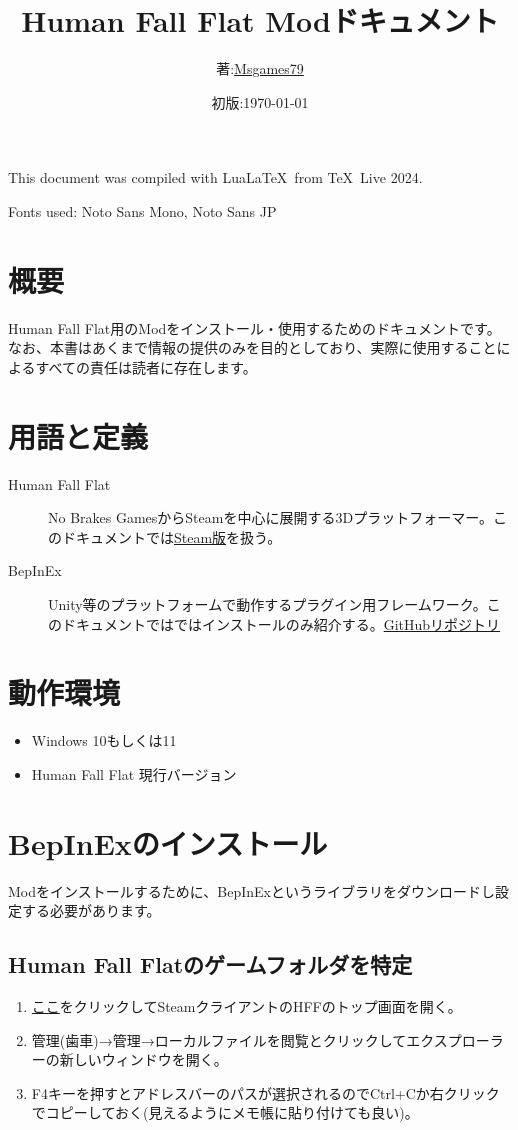 \documentclass[lualatex,a4paper,fontsize=11pt,jafontscale=0.9247,titlepage,oneside]{jlreq}
\begin{document}
\title{Human Fall Flat Modドキュメント}
\author{著:\;\href{https://www.youtube.com/channel/UCKpnq5EXLCcuPsEGAjyXbsg}{Msgames79}}
\date{初版:\;\today}
\maketitle
This document was compiled with Lua\LaTeX\ from \TeX\ Live 2024.\par
Fonts used: Noto Sans Mono, Noto Sans JP
\tableofcontents
\clearpage
\section{概要}
Human Fall Flat用のModをインストール・使用するためのドキュメントです。なお、本書はあくまで情報の提供のみを目的としており、実際に使用することによるすべての責任は読者に存在します。
\section{用語と定義}
\begin{description}
\item[Human Fall Flat]No Brakes GamesからSteamを中心に展開する3Dプラットフォーマー。このドキュメントでは\href{https://store.steampowered.com/app/477160}{Steam版}を扱う。
\item[BepInEx]Unity等のプラットフォームで動作するプラグイン用フレームワーク。このドキュメントではではインストールのみ紹介する。\href{https://github.com/BepInEx/BepInEx}{GitHubリポジトリ}
\end{description}
\section{動作環境}
\begin{itemize}
\item Windows 10もしくは11
\item Human Fall Flat 現行バージョン
\end{itemize}
\section{BepInExのインストール}
Modをインストールするために、BepInExというライブラリをダウンロードし設定する必要があります。
\subsection{Human Fall Flatのゲームフォルダを特定}
\begin{enumerate}
\item \href{steam://open/games/details/477160}{ここ}をクリックしてSteamクライアントのHFFのトップ画面を開く。
\item \label{4.1.2}管理(歯車)→管理→ローカルファイルを閲覧とクリックしてエクスプローラーの新しいウィンドウを開く。
\item \label{4.1.3}F4キーを押すとアドレスバーのパスが選択されるのでCtrl+Cか右クリックでコピーしておく(見えるようにメモ帳に貼り付けても良い)。
\end{enumerate}
\end{document}
